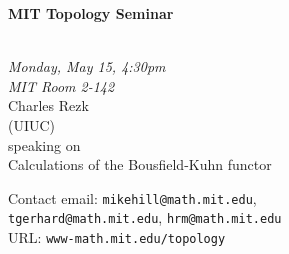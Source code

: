 \documentclass{slides}
\begin{document}
\begin{center}

{\fontsize {54pt}{40pt}\selectfont

\textrm{
{\textbf{MIT Topology Seminar}}}
}\\
\vspace{1cm}
{\large\textrm{\emph{Monday, May 15, 4:30pm\\MIT Room 2-142}}}\\
\vspace{1cm}
\textrm{{\LARGE Charles Rezk  \\[.5cm](UIUC)}}\\
\vspace{1cm} %
\textrm{speaking on}\\ %
\vspace{5mm}
\textrm{{\LARGE  Calculations of the Bousfield-Kuhn functor}}\\
\end{center}
\vspace{1cm}
{\small


\textrm{Contact email: } \texttt{mikehill@math.mit.edu}, \\
\texttt{tgerhard@math.mit.edu},
\texttt{hrm@math.mit.edu}\\
\textrm{URL: } \texttt{www-math.mit.edu/topology}
}
\end{document}
